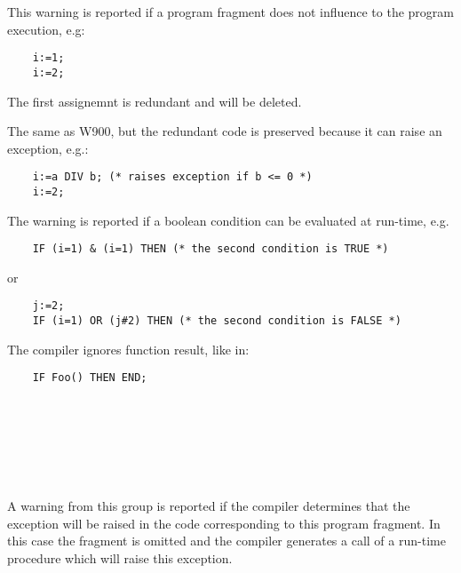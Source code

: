 
This warning is reported if a program fragment does not influence
to the program execution, e.g:

\verb'    i:=1;'\\
\verb'    i:=2;'

The first assignemnt is redundant and will be deleted.


The same as W900, but the redundant code is preserved because it can
raise an exception, e.g.:

\verb'    i:=a DIV b; (* raises exception if b <= 0 *)'\\
\verb'    i:=2;'


The warning is reported if a boolean condition can be evaluated at
run-time, e.g.

\verb'    IF (i=1) & (i=1) THEN (* the second condition is TRUE *)'

or

\verb'    j:=2;'\\
\verb'    IF (i=1) OR (j#2) THEN (* the second condition is FALSE *)'


The compiler ignores function result, like in:

\verb'    IF Foo() THEN END;'

         \ifonline\else\\\fi
{}        \ifonline\else\\\fi
{}          \ifonline\else\\\fi
{}             \ifonline\else\\\fi
{}             \ifonline\else\\\fi
{}

A warning from this group is reported if the compiler determines that
the exception will be raised in the code corresponding to this program
fragment. In this case the fragment is omitted and the compiler
generates a call of a run-time procedure which will raise this exception.

